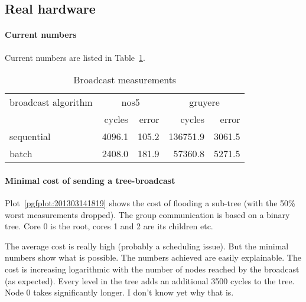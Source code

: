 \documentclass{article}
\begin{document}
\subsection{Real hardware}

\paragraph{Current numbers} Current numbers are listed in
Table~\ref{tab:bc_measurements}. 

\begin{table}[htb]
  \centering
  \begin{tabular}{lrrrr}
    \toprule
    broadcast algorithm & \multicolumn{2}{c}{nos5} & \multicolumn{2}{c}{gruyere} \\
      & cycles & error & cycles & error \\
    \midrule
    sequential &  4096.1 &  105.2 & 136751.9 &   3061.5 \\
    batch      &  2408.0 &  181.9 &  57360.8 &   5271.5 \\
    \bottomrule
  \end{tabular}
  \caption{Broadcast measurements}
  \label{tab:bc_measurements}
\end{table}

\paragraph{Minimal cost of sending a tree-broadcast} %
Plot~\ref{pgfplot:201303141819} shows the cost of flooding a sub-tree
(with the 50\% worst measurements dropped). The group communication is
based on a binary tree. Core 0 is the root, cores 1 and 2 are its
children etc.

The average cost is really high (probably a scheduling issue). But the
minimal numbers show what is possible. The numbers achieved are easily
explainable. The cost is increasing logarithmic with the number of
nodes reached by the broadcast (as expected). Every level in the tree
adds an additional 3500 cycles to the tree. Node 0 takes significantly
longer. I don't know yet why that is.
\end{document}
